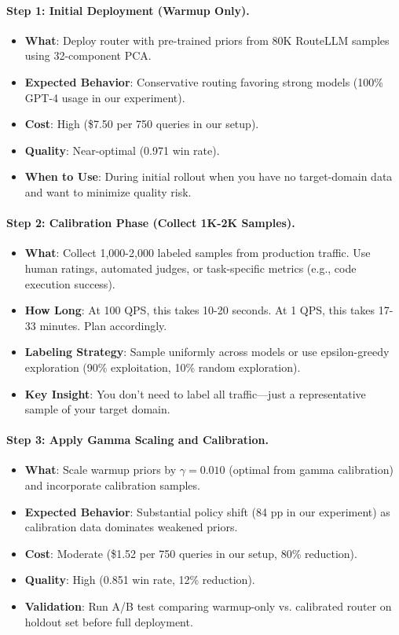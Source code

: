 \paragraph{Step 1: Initial Deployment (Warmup Only).}
\begin{itemize}
    \item \textbf{What}: Deploy router with pre-trained priors from 80K RouteLLM samples using 32-component PCA.
    \item \textbf{Expected Behavior}: Conservative routing favoring strong models (100\% GPT-4 usage in our experiment).
    \item \textbf{Cost}: High (\$7.50 per 750 queries in our setup).
    \item \textbf{Quality}: Near-optimal (0.971 win rate).
    \item \textbf{When to Use}: During initial rollout when you have no target-domain data and want to minimize quality risk.
\end{itemize}

\paragraph{Step 2: Calibration Phase (Collect 1K-2K Samples).}
\begin{itemize}
    \item \textbf{What}: Collect 1,000-2,000 labeled samples from production traffic. Use human ratings, automated judges, or task-specific metrics (e.g., code execution success).
    \item \textbf{How Long}: At 100 QPS, this takes 10-20 seconds. At 1 QPS, this takes 17-33 minutes. Plan accordingly.
    \item \textbf{Labeling Strategy}: Sample uniformly across models or use epsilon-greedy exploration (90\% exploitation, 10\% random exploration).
    \item \textbf{Key Insight}: You don't need to label all traffic—just a representative sample of your target domain.
\end{itemize}

\paragraph{Step 3: Apply Gamma Scaling and Calibration.}
\begin{itemize}
    \item \textbf{What}: Scale warmup priors by $\gamma=0.010$ (optimal from gamma calibration) and incorporate calibration samples.
    \item \textbf{Expected Behavior}: Substantial policy shift (84 pp in our experiment) as calibration data dominates weakened priors.
    \item \textbf{Cost}: Moderate (\$1.52 per 750 queries in our setup, 80\% reduction).
    \item \textbf{Quality}: High (0.851 win rate, 12\% reduction).
    \item \textbf{Validation}: Run A/B test comparing warmup-only vs. calibrated router on holdout set before full deployment.
\end{itemize}

